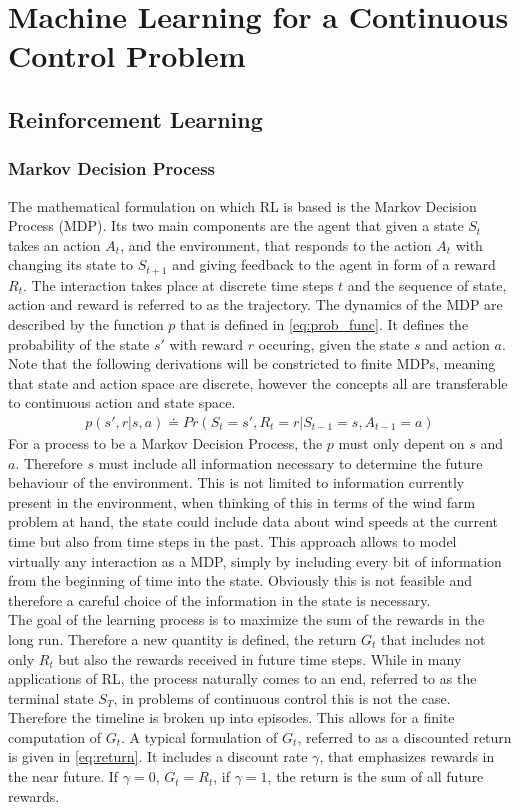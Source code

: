 \chapter{Machine Learning for a Continuous Control Problem}
\section{Reinforcement Learning}
\subsection{Markov Decision Process}
The mathematical formulation on which RL is based is the Markov Decision Process (MDP). Its two main components are the agent that given a state $S_t$ takes an action $A_t$, and the environment, that responds to the action $A_t$ with changing its state to $S_{t+1}$ and giving feedback to the agent in form of a reward $R_t$. The interaction takes place at discrete time steps $t$ and the sequence of state, action and reward is referred to as the trajectory. The dynamics of the MDP are described by the function $p$ that is defined in \eqref{eq:prob_func}. It defines the probability of the state $s'$ with reward $r$ occuring, given the state $s$ and action $a$. Note that the following derivations will be constricted to finite MDPs, meaning that state and action space are discrete, however the concepts all are transferable to continuous action and state space.
\begin{align}
	p(s',r \vert s,a) \doteq Pr(S_t=s', R_t=r \vert S_{t-1} = s, A_{t-1} = a) \label{eq:prob_func}
\end{align}
For a process to be a Markov Decision Process, the $p$ must only depent on $s$ and $a$. Therefore $s$ must include all information necessary to determine the future behaviour of the environment. This is not limited to information currently present in the environment, when thinking of this in terms of the wind farm problem at hand, the state could include data about wind speeds at the current time but also from time steps in the past. This approach allows to model virtually any interaction as a MDP, simply by including every bit of information from the beginning of time into the state. Obviously this is not feasible and therefore a careful choice of the information in the state is necessary. \\
The goal of the learning process is to maximize the sum of the rewards in the long run. Therefore a new quantity is defined, the return $G_t$ that includes not only $R_t$ but also the rewards received in future time steps. While in many applications of RL, the process naturally comes to an end, referred to as the terminal state $S_T$, in problems of continuous control this is not the case. Therefore the timeline is broken up into episodes. This allows for a finite computation of $G_t$. A typical formulation of $G_t$, referred to as a discounted return is given in \eqref{eq:return}. It includes a discount rate $\gamma$, that emphasizes rewards in the near future. If $\gamma = 0$, $G_t = R_t$, if $\gamma = 1$, the return is the sum of all future rewards. \cite[p. 47- 57]{sutton_reinforcement_2018}
